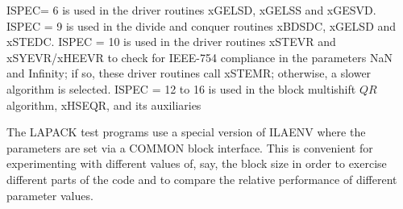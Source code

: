 ISPEC= 6 is used in the driver 
routines xGELSD, xGELSS and xGESVD.
ISPEC = 9 is used in the
divide and conquer routines xBDSDC, xGELSD and xSTEDC.
ISPEC = 10 is used in the driver routines
xSTEVR and xSYEVR/xHEEVR to check for IEEE-754 compliance
in the parameters NaN and Infinity;  if so, these driver routines call xSTEMR;
otherwise, a slower algorithm is selected. 
ISPEC = 12 to 16 is used  in the 
block multishift $QR$ algorithm, xHSEQR, and its auxiliaries

The LAPACK test programs use a special version of ILAENV
where the parameters are set via a COMMON block interface.
This is convenient for experimenting with different values of, say,
the block size in order to exercise different parts of the code
and to compare the relative performance of different parameter values.

